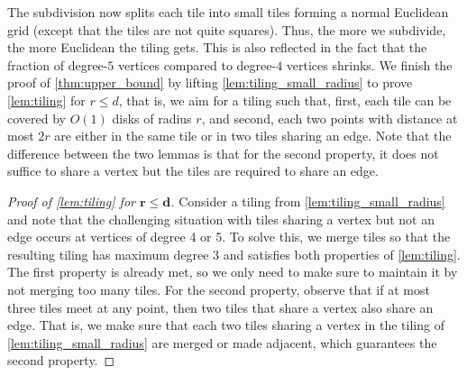 The subdivision now splits each tile into small tiles forming a normal Euclidean grid (except that the tiles are not quite squares).
Thus, the more we subdivide, the more Euclidean the tiling gets.
This is also reflected in the fact that the fraction of degree-$5$ vertices compared to degree-$4$ vertices shrinks.
%
We finish the proof of \cref{thm:upper_bound} by lifting \cref{lem:tiling_small_radius} to prove \cref{lem:tiling} for $ r \leq d $, that is, we aim for a tiling such that, first, each tile can be covered by $ O(1) $ disks of radius $ r $, and second, each two points with distance at most $ 2r $ are either in the same tile or in two tiles sharing an edge.
Note that the difference between the two lemmas is that for the second property, it does not suffice to share a vertex but the tiles are required to share an edge.
%
\begin{proof}[Proof of \cref{lem:tiling} for $ \bm{r \leq d} $]
    Consider a tiling from \cref{lem:tiling_small_radius} and note that the challenging situation with tiles sharing a vertex but not an edge occurs at vertices of degree 4 or 5.
    To solve this, we merge tiles so that the resulting tiling has maximum degree 3 and satisfies both properties of \cref{lem:tiling}.
    The first property is already met, so we only need to make sure to maintain it by not merging too many tiles.
    For the second property, observe that if at most three tiles meet at any point, then two tiles that share a vertex also share an edge.
    That is, we make sure that each two tiles sharing a vertex in the tiling of \cref{lem:tiling_small_radius} are merged or made adjacent, which guarantees the second property.
%

\end{proof}
